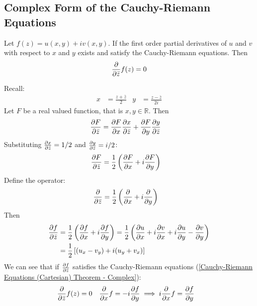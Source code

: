 \documentclass[12pt, english]{book}
\makeatletter
\renewenvironment{proof}[1][\proofname]{\par
	\pushQED{\qed}%
	\normalfont \topsep6\p@\@plus6\p@\relax
	\list{}{%
		\settowidth{\leftmargin}{\itshape\proofname:\hskip\labelsep}%
		\setlength{\labelwidth}{0pt}%
		\setlength{\itemindent}{-\leftmargin}%
	}%
	\item[\hskip\labelsep\itshape#1\@addpunct{:}]\ignorespaces
	}{ \popQED\endlist\@endpefalse}
\makeatother
\begin{document}
	\subsection{Complex Form of the Cauchy-Riemann Equations} 
	\label{Cauchy-Riemann Equations (Complex) Subsection - Complex}
	
	\begin{theorem}
		\label{Cauchy-Riemann Equations (Complex) Theorem - Complex}
		Let \(f(z) = u(x,y) + iv(x,y)\). If the first order partial derivatives of \(u\) and \(v\) with respect to \(x\) and \(y\) exists and satisfy the Cauchy-Riemann equations. Then
		\[\pdv{\bar{z}} f(z) = 0\]
	\end{theorem}
	\begin{proof}{\color{Grey}
		Recall:
		\begin{align*}
			x &= \frac{z + \bar{z}}{2} & y &= \frac{z - \bar{z}}{2i}
		\end{align*}
		Let \(F\) be a real valued function, that is \(x, y \in \mathbb{R}\). Then
		\begin{align*}
			\pdv{F}{\bar{z}} &= \pdv{F}{x} \pdv{x}{\bar{z}} + \pdv{F}{y} \pdv{y}{\bar{z}}
		\end{align*}
		Substituting \(\pdv{x}{\bar{z}} = 1/2\) and \(\pdv{y}{\bar{z}} = i/2\):
		\begin{align*}
			\pdv{F}{\bar{z}} &= \frac{1}{2} \left(\pdv{F}{x} + i \pdv{F}{y} \right)
		\end{align*}
		Define the operator:
		\begin{align*}
			\pdv{\bar{z}} &= \frac{1}{2} \left(\pdv{x} + i \pdv{y} \right)
		\end{align*}
		Then 
		\begin{align*}
			\pdv{f}{\bar{z}} &= \frac{1}{2} \left(\pdv{f}{x} + i \pdv{f}{y} \right)
				= \frac{1}{2} \left(\pdv{u}{x} + i \pdv{v}{x} + i\pdv{u}{y} -  \pdv{v}{y}  \right) \\
				&= \frac{1}{2} \left[ (u_x - v_y) + i (u_y + v_x)\right]
		\end{align*}
		We can see that if \(\pdv{f}{\bar{z}}\) satisfies the Cauchy-Riemann equations (\cref{Cauchy-Riemann Equations (Cartesian) Theorem - Complex}):
		\begin{align*}
			\pdv{\bar{z}} f(z) &= 0 & \pdv{x}f &= -i \pdv{f}{y} \implies i\pdv{x}f = \pdv{f}{y} 
		\end{align*}
		}
	\end{proof}
	
\end{document}
